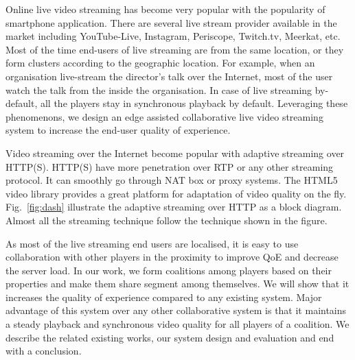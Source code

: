 Online live video streaming has become very popular with the popularity of smartphone application. There are several live stream provider available in the market including YouTube-Live, Instagram, Periscope, Twitch.tv, Meerkat, etc. Most of the time end-users of live streaming are from the same location, or they form clusters according to the geographic location. For example, when an organisation live-stream the director's talk over the Internet, most of the user watch the talk from the inside the organisation. In case of live streaming by-default, all the players stay in synchronous playback by default. Leveraging these phenomenons, we design an edge assisted collaborative live video streaming system to increase the end-user quality of experience.

Video streaming over the Internet become popular with adaptive streaming over HTTP(S). HTTP(S) have more penetration over RTP or any other streaming protocol. It can smoothly go through NAT box or proxy systems. The HTML5 video library provides a great platform for adaptation of video quality on the fly. Fig.~\ref{fig:dash} illustrate the adaptive streaming over HTTP as a block diagram. Almost all the streaming technique follow the technique shown in the figure.

As most of the live streaming end users are localised, it is easy to use collaboration with other players in the proximity to improve QoE and decrease the server load. In our work, we form coalitions among players based on their properties and make them share segment among themselves. We will show that it increases the quality of experience compared to any existing system. Major advantage of this system over any other collaborative system is that it maintains a steady playback and synchronous video quality for all players of a coalition. We describe the related existing works, our system design and evaluation and end with a conclusion.
\fi 


